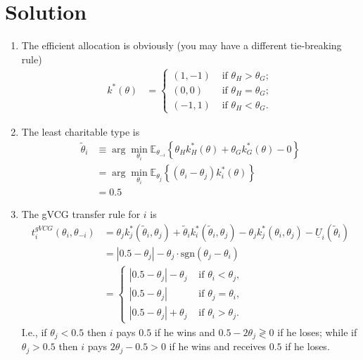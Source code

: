 \documentclass[a4paper]{article}
\newif\ifsolutions
\begin{document}
\ifsolutions
\section*{Solution}

\begin{enumerate}
	\item The efficient allocation is obviously (you may have a different tie-breaking
	rule)
	\begin{align*}
		k^{*}(\theta) & =\begin{cases}
			(1,-1) & \text{ if }\theta_{H}>\theta_{G};\\
			(0, 0) & \text{ if }\theta_{H}=\theta_{G};\\
			(-1,1) & \text{ if }\theta_{H}<\theta_{G}.
		\end{cases}
	\end{align*}
	
	\item The least charitable type is 
	\begin{align*}
		\tilde{\theta}_{i} & \equiv \arg\min_{\theta_{i}} \mathbb{E}_{\theta_{-i}} \left\{ \theta_{H} k^*_{H}(\theta) + \theta_{G} k^*_{G}(\theta) - 0 \right\} 
		\\
		& =\arg\min_{\theta_{i}}\mathbb{E}_{\theta_{j}} \left\{  \left(\theta_{i}-\theta_{j}\right) k_{i}^{*} (\theta) \right\} 
		\\
		& =0.5
	\end{align*}
	
	\item The gVCG transfer rule for $i$ is
	\begin{align*}
		t^{gVCG}_i(\theta_i,\theta_{-i}) &= \theta_j k_j^*(\tilde{\theta}_i,\theta_{j}) + \tilde{\theta}_i k_i^*(\tilde{\theta}_i,\theta_{j}) - \theta_j k_j^*({\theta}_i,\theta_{j}) - \underline{U}_i (\tilde{\theta}_i)
		\\
		&= |0.5-\theta_j| - \theta_j \cdot \text{sgn}(\theta_j - \theta_i)
		\\
		&= \begin{cases}
			|0.5-\theta_j| - \theta_j & \text{ if } \theta_i < \theta_j,
			\\
			|0.5-\theta_j| 			& \text{ if } \theta_j = \theta_i,
			\\
			|0.5-\theta_j| + \theta_j & \text{ if } \theta_i > \theta_j.
		\end{cases}
	\end{align*}
	I.e., if $\theta_j < 0.5$ then $i$ pays $0.5$ if he wins and $0.5-2\theta_j \gtrless 0$ if he loses; while if $\theta_j > 0.5$ then $i$ pays $2\theta_j - 0.5 > 0$ if he wins and receives $0.5$ if he loses.
	

\end{enumerate}
\end{document}
